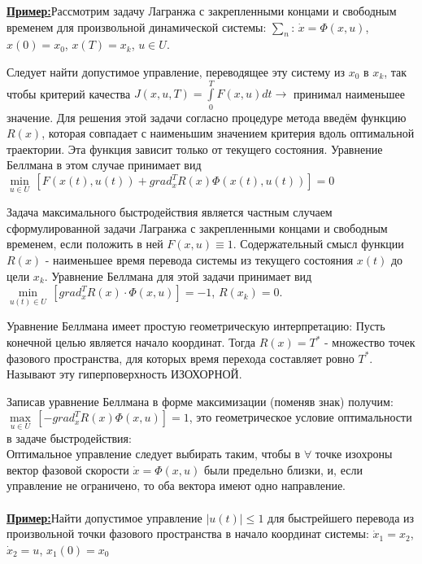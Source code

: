 \documentclass[preprint,russian,a5paper,10pt,twoside,mediummath]{ncc}
\newcommand{\ExampleMy}{\vspace{\baselineskip}\textbf{\underline{Пример:}}}
\begin{document}
\ExampleMy Рассмотрим задачу Лагранжа с закрепленными концами и свободным временем для произвольной динамической системы: $\sum\nolimits_{n}{{}}$: $\dot{x}=\Phi \left( x,u \right)$, $x\left( 0 \right)={{x}_{0}}$, $x\left( T \right)={{x}_{k}}$, $u\in U$. 
\par Следует найти допустимое управление, переводящее эту систему из ${{x}_{0}}$ в ${{x}_{k}}$, так чтобы критерий качества $J\left( x,u,T \right)=\int\limits_{0}^{T}{F\left( x,u \right)}dt\to $ принимал наименьшее значение. Для решения этой задачи согласно процедуре метода введём функцию $R\left( x \right)$, которая совпадает с наименьшим значением критерия вдоль оптимальной траектории. Эта функция зависит только от текущего состояния. Уравнение Беллмана в этом случае принимает вид $\underset{u\in U}{\mathop{\min }}\,\left[ F\left( x\left( t \right),u\left( t \right) \right)+grad_{x}^{T}R\left( x \right)\Phi \left( x\left( t \right),u\left( t \right) \right) \right]=0$
\par Задача максимального быстродействия является частным случаем сформулированной задачи Лагранжа с закрепленными концами и свободным временем, если положить в ней $F\left( x,u \right)\equiv 1$. Содержательный смысл функции $R\left( x \right)$ - наименьшее время перевода системы из текущего состояния $x\left( t \right)$ до цели ${{x}_{k}}$. Уравнение Беллмана для этой задачи принимает вид 
$\underset{u\left( t \right)\in U}{\mathop{\min }}\,\left[ grad_{x}^{T}R\left( x \right)\cdot \Phi \left( x,u \right) \right]=-1$, $R\left( {{x}_{k}} \right)=0$.
\par Уравнение Беллмана имеет простую геометрическую интерпретацию: Пусть конечной целью является начало координат. Тогда $R\left( x \right)={{T}^{*}}$ - множество точек фазового пространства, для которых время перехода составляет ровно ${{T}^{*}}$. Называют эту гиперповерхность ИЗОХОРНОЙ.
\par Записав уравнение Беллмана в форме максимизации (поменяв знак) получим:
\\$\underset{u\in U}{\mathop{\max }}\,\left[ -grad_{x}^{T}R\left( x \right)\Phi \left( x,u \right) \right]=1$, это геометрическое условие оптимальности в задаче быстродействия:
\\Оптимальное управление следует выбирать таким, чтобы в $\forall $ точке изохроны вектор фазовой скорости $\dot{x}=\Phi \left( x,u \right)$ были предельно близки, и, если управление не ограничено, то оба вектора имеют одно направление.
\\\\\ExampleMy Найти допустимое управление $\left| u\left( t \right) \right|\le 1$ для быстрейшего перевода из произвольной точки фазового пространства в начало координат системы: ${{\dot{x}}_{1}}={{x}_{2}}$, ${{\dot{x}}_{2}}=u$, ${{x}_{1}}\left( 0 \right)={{x}_{0}}$ 
\end{document}

